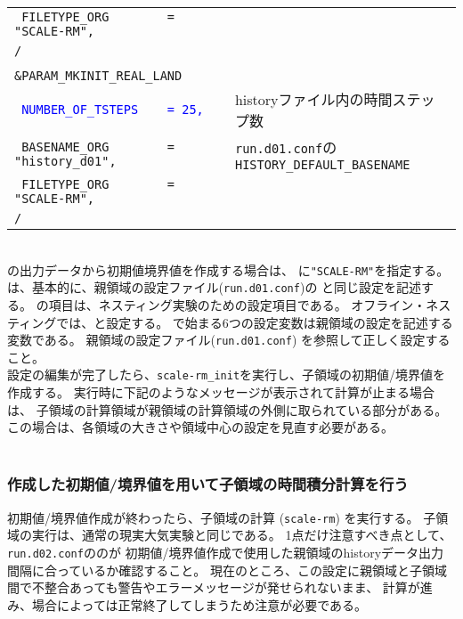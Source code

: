 {{{\begin{tabularx}{150mm}{lX}
\verb| FILETYPE_ORG        = "SCALE-RM",| & \\
\verb|/| &\\
 & \\
\verb|&PARAM_MKINIT_REAL_LAND| &\\
\textcolor{blue}{\verb| NUMBER_OF_TSTEPS    = 25,|}         & historyファイル内の時間ステップ数\\
\verb| BASENAME_ORG        = "history_d01",|  & \verb|run.d01.conf|の\verb|HISTORY_DEFAULT_BASENAME|\\
\verb| FILETYPE_ORG        = "SCALE-RM",| & \\
\verb|/| &\\
\end{tabularx}
}}}\\


\scalerm の出力データから初期値境界値を作成する場合は、
に\verb|"SCALE-RM"|を指定する。
は、基本的に、親領域の設定ファイル(\verb|run.d01.conf|)の
と同じ設定を記述する。
%
の項目は、ネスティング実験のための設定項目である。
オフライン・ネスティングでは、と設定する。
 で始まる6つの設定変数は親領域の設定を記述する変数である。
親領域の設定ファイル(\verb|run.d01.conf|) を参照して正しく設定すること。\\


設定の編集が完了したら、\verb|scale-rm_init|を実行し、子領域の初期値/境界値を作成する。
実行時に下記のようなメッセージが表示されて計算が止まる場合は、
子領域の計算領域が親領域の計算領域の外側に取られている部分がある。
この場合は、各領域の大きさや領域中心の設定を見直す必要がある。\\

\\



\subsubsection{作成した初期値/境界値を用いて子領域の時間積分計算を行う}
初期値/境界値作成が終わったら、子領域の計算 (\verb|scale-rm|) を実行する。
子領域の実行は、通常の現実大気実験と同じである。
1点だけ注意すべき点として、
\verb|run.d02.conf|ののが
初期値/境界値作成で使用した親領域のhistoryデータ出力間隔に合っているか確認すること。
現在のところ、この設定に親領域と子領域間で不整合あっても警告やエラーメッセージが発せられないまま、
計算が進み、場合によっては正常終了してしまうため注意が必要である。


